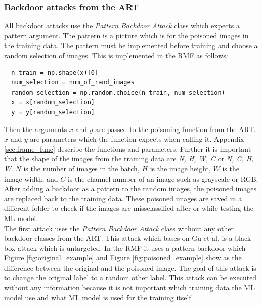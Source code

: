 \subsubsection*{Backdoor attacks from the ART}
\label{sec:backdoors_art}

All backdoor attacks use the \textit{Pattern Backdoor Attack} \cite{DBLP:journals/corr/abs-1708-06733} class which expects a pattern argument. The pattern is a picture which is for the poisoned images in the training data. The pattern must be implemented before training and choose a random selection of images. This is implemented in the RMF as follows:

\begin{lstlisting}
  n_train = np.shape(x)[0]
  num_selection = num_of_rand_images
  random_selection = np.random.choice(n_train, num_selection)
  x = x[random_selection]
  y = y[random_selection]
\end{lstlisting}

Then the arguments $x$ and $y$ are passed to the poisoning function from the ART. $x$ and $y$ are parameters which the function expects when calling it. Appendix \ref{sec:frame_func}
describe the functions and parameters. Further it is important that the shape of the images from the training data are \textit{N, H, W, C} or \textit{N, C, H, W}. $N$ is the number of
images in the batch, $H$ is the image height, $W$ is the image width, and $C$ is the channel number of an image such as grayscale or RGB. After adding a backdoor as a pattern to the
random images, the poisoned images are replaced back to the training data. These poisoned images are saved in a different folder to check if the images are missclassified after or while
testing the ML model.\\


The first attack uses the \textit{Pattern Backdoor Attack} class without any other backdoor classes from the ART. This attack which bases on Gu et al. \cite{DBLP:journals/corr/abs-1708-06733} is a black-box attack which is untargeted. In the RMF it uses a pattern backdoor which Figure \ref{fig:original_example} and Figure \ref{fig:poisoned_example} show as the
difference between the original and the poisoned image. The goal of this attack is to change the original label to a random other label. This attack can be executed without any
information because it is not important which training data the ML model use and what ML model is used for the training itself.

